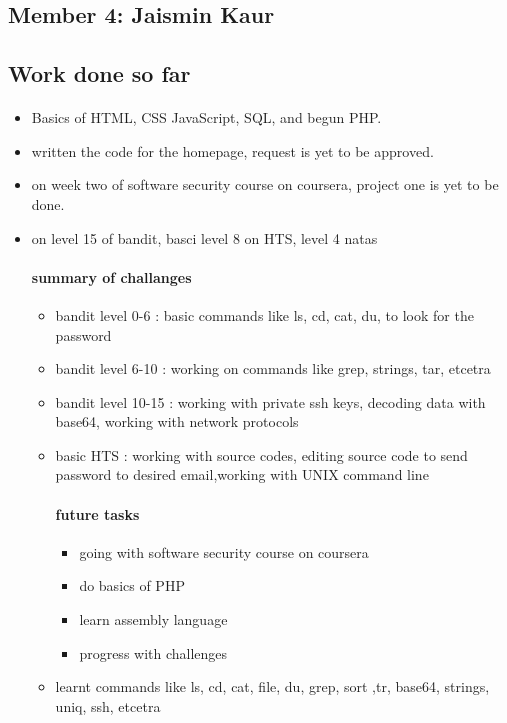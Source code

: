 \documentclass{article}
\begin{document}
\begin{itemize}
\newpage
\section*{Member 4: Jaismin Kaur}
\subsection*{Work done so far}
\paragraph{}
\begin{itemize}
    \item Basics of HTML, CSS JavaScript, SQL, and begun PHP.
    \item written the code for the homepage, request is yet to be approved.
    \item on week two of software security course on coursera, project one is yet to be done.
    \item on level 15 of bandit, basci level 8 on HTS, level 4 natas
\paragraph{summary of challanges} 
\begin{itemize}
    \item bandit level 0-6 : basic commands like ls, cd, cat, du, to look for the password
    \item bandit level 6-10 : working on commands like grep, strings, tar, etcetra
    \item bandit level 10-15 : working with private ssh keys, decoding data with base64, working with network protocols
    \item basic HTS : working with source codes, editing source code to send password to desired email,working with UNIX command line
\paragraph{future tasks}
\begin{itemize}
    \item going with software security course on coursera
    \item do basics of PHP
    \item learn assembly language
    \item progress with challenges
\end{itemize}
\end{itemize}
\begin{itemize}
    \item learnt commands like ls, cd, cat, file, du, grep, sort ,tr, base64, strings, uniq, ssh, etcetra
\end{itemize}
    
\end{itemize}
\end{itemize}
\newpage
\end{document}
